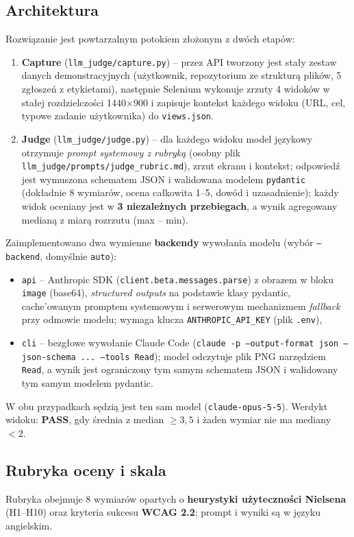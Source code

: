 \documentclass[11pt,a4paper]{article}
\begin{document}
\subsection{Architektura}
Rozwiązanie jest powtarzalnym potokiem złożonym z dwóch etapów:
\begin{enumerate}
  \item \textbf{Capture} (\texttt{llm\_judge/capture.py}) -- przez API tworzony jest stały zestaw
        danych demonstracyjnych (użytkownik, repozytorium ze strukturą plików, 5 zgłoszeń z etykietami),
        następnie Selenium wykonuje zrzuty 4 widoków w stałej rozdzielczości 1440$\times$900 i zapisuje
        kontekst każdego widoku (URL, cel, typowe zadanie użytkownika) do \texttt{views.json}.
  \item \textbf{Judge} (\texttt{llm\_judge/judge.py}) -- dla każdego widoku model językowy otrzymuje
        \emph{prompt systemowy z rubryką} (osobny plik \texttt{llm\_judge/prompts/judge\_rubric.md}),
        zrzut ekranu i kontekst; odpowiedź jest wymuszona schematem JSON i walidowana modelem
        \texttt{pydantic} (dokładnie 8 wymiarów, ocena całkowita 1--5, dowód i uzasadnienie);
        każdy widok oceniany jest w \textbf{3 niezależnych przebiegach}, a wynik agregowany medianą
        z miarą rozrzutu (max -- min).
\end{enumerate}

Zaimplementowano dwa wymienne \textbf{backendy} wywołania modelu (wybór \texttt{--backend},
domyślnie \texttt{auto}):
\begin{itemize}
  \item \texttt{api} -- Anthropic SDK (\texttt{client.beta.messages.parse}) z obrazem w bloku
        \texttt{image} (base64), \emph{structured outputs} na podstawie klasy pydantic, cache'owanym
        promptem systemowym i serwerowym mechanizmem \emph{fallback} przy odmowie modelu;
        wymaga klucza \texttt{ANTHROPIC\_API\_KEY} (plik \texttt{.env}),
  \item \texttt{cli} -- bezgłowe wywołanie Claude Code (\texttt{claude -p --output-format json
        --json-schema ... --tools Read}); model odczytuje plik PNG narzędziem \texttt{Read},
        a wynik jest ograniczony tym samym schematem JSON i walidowany tym samym modelem pydantic.
\end{itemize}
W obu przypadkach sędzią jest ten sam model (\texttt{claude-opus-5-5}). Werdykt widoku:
\textbf{PASS}, gdy średnia z median $\geq 3{,}5$ i żaden wymiar nie ma mediany $< 2$.

\subsection{Rubryka oceny i skala}
Rubryka obejmuje 8 wymiarów opartych o \textbf{heurystyki użyteczności Nielsena} (H1--H10)
oraz kryteria sukcesu \textbf{WCAG 2.2}; prompt i wyniki są w języku angielskim.
\end{document}
